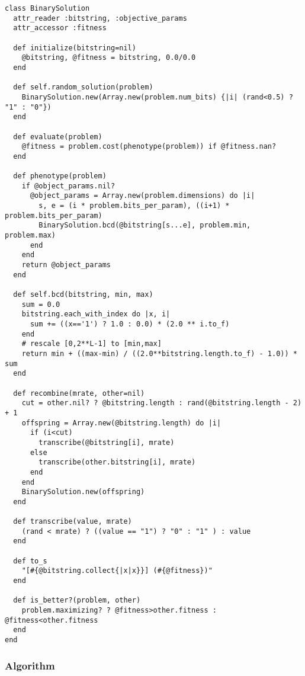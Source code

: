 \begin{lstlisting}[name=ga-solution] 
class BinarySolution
  attr_reader :bitstring, :objective_params 
  attr_accessor :fitness
  
  def initialize(bitstring=nil)
    @bitstring, @fitness = bitstring, 0.0/0.0
  end
  
  def self.random_solution(problem)
    BinarySolution.new(Array.new(problem.num_bits) {|i| (rand<0.5) ? "1" : "0"})
  end
  
  def evaluate(problem)
    @fitness = problem.cost(phenotype(problem)) if @fitness.nan?
  end
  
  def phenotype(problem)
    if @object_params.nil? 
      @object_params = Array.new(problem.dimensions) do |i| 
        s, e = (i * problem.bits_per_param), ((i+1) * problem.bits_per_param)
        BinarySolution.bcd(@bitstring[s...e], problem.min, problem.max)
      end
    end
    return @object_params
  end  
  
  def self.bcd(bitstring, min, max)
    sum = 0.0
    bitstring.each_with_index do |x, i|
      sum += ((x=='1') ? 1.0 : 0.0) * (2.0 ** i.to_f)
    end
    # rescale [0,2**L-1] to [min,max]
    return min + ((max-min) / ((2.0**bitstring.length.to_f) - 1.0)) * sum
  end
  
  def recombine(mrate, other=nil)
    cut = other.nil? ? @bitstring.length : rand(@bitstring.length - 2) + 1
    offspring = Array.new(@bitstring.length) do |i| 
      if (i<cut) 
        transcribe(@bitstring[i], mrate) 
      else
        transcribe(other.bitstring[i], mrate) 
      end
    end
    BinarySolution.new(offspring)
  end

  def transcribe(value, mrate)
    (rand < mrate) ? ((value == "1") ? "0" : "1" ) : value
  end
  
  def to_s
    "[#{@bitstring.collect{|x|x}}] (#{@fitness})"
  end
  
  def is_better?(problem, other)
    problem.maximizing? ? @fitness>other.fitness : @fitness<other.fitness
  end      
end
\end{lstlisting}



\subsubsection{Algorithm}


